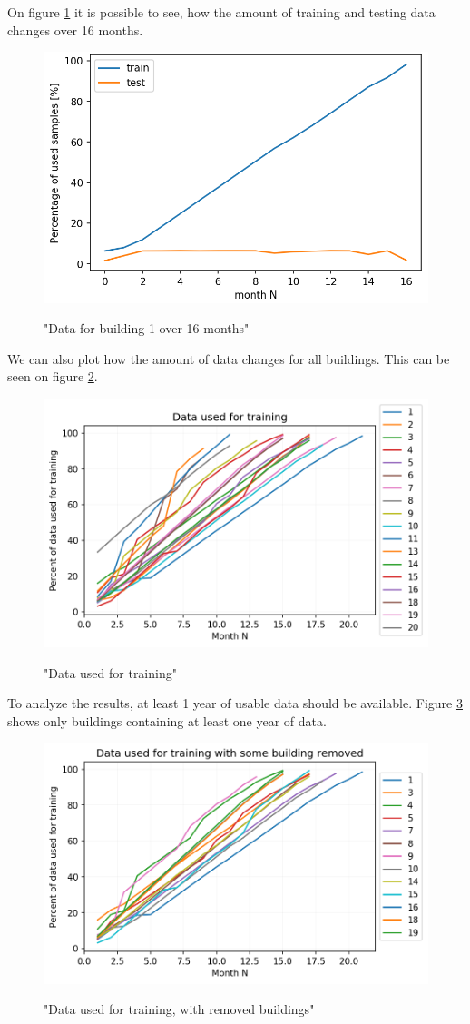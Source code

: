 On figure \ref{fig:dyn_data_1} it is possible to see,
how the amount of training and testing data changes over 16 months.

\begin{figure}[H]
	\centering
	\caption{"Data for building 1 over 16 months"}
	\includegraphics[width=.7\textwidth]{Figures/EC/DYN/tst_tr_b1.png}
	\label{fig:dyn_data_1}
\end{figure}

We can also plot how the amount of data changes for all buildings.
This can be seen on figure \ref{fig:data_used_for_training}.

\begin{figure}[H]
	\centering
	\caption{"Data used for training"}
	\includegraphics[width=.7\textwidth]{Figures/EC/DYN/data_used_for_training_all.png}
	\label{fig:data_used_for_training}
\end{figure}

To analyze the results, at least 1 year of usable data should be available. 
Figure \ref{fig:data_used_for_training_removed} shows only buildings containing at least one year of data.
\begin{figure}[H]
	\centering
	\caption{"Data used for training, with removed buildings"}
	\includegraphics[width=.7\textwidth]{Figures/EC/DYN/data_used_for_training_removed_short.png}
	\label{fig:data_used_for_training_removed}
\end{figure}

